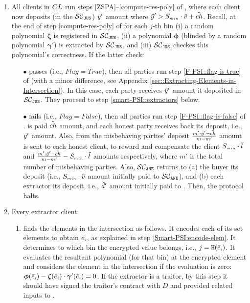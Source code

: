 \begin{enumerate}[leftmargin=4mm]
\item\label{e-psi::invoke-remainer-F-PSI} All clients in ${CL}$   run steps \ref{ZSPA}--\ref{compute-res-poly} of \fpsi, where each client now deposits (in the $\mathcal{SC}_{\mathtt{JUS}}$) $\ddot{y}'$ amount where $\ddot{y}'>S_{\scriptscriptstyle min}\cdot \ddot{v}+{\ddot{ch}}$. Recall, at the end of step \ref{compute-res-poly}  of \fpsi for each $j$-th bin (i) a random polynomial $\bm\zeta$ is registered in $\mathcal{SC}_{\mathtt{JUS}}$, (ii) a polynomial $\bm\phi$ (blinded by a random polynomial $\bm\gamma'$) is extracted by $\mathcal{SC}_{\mathtt{JUS}}$, and (iii) $\mathcal{SC}_{\mathtt{JUS}}$  checkes this polynomial's  correctness. If the latter check:

\begin{itemize}
\item[$\bullet$] passes (i.e., $Flag=True$), then all parties run step \ref{F-PSI::flag-is-true} of \fpsi (with a minor difference, see Appendix \ref{sec::Extracting-Elements-in-Intersection}).  In this case, each party receives $\ddot{y}'$ amount it deposited in $\mathcal{SC}_{\mathtt{JUS}}$. They proceed to step \ref{smart-PSI::extractors} below.

\item[$\bullet$]  fails (i.e., $Flag=False$), then all parties run step \ref{F-PSI::flag-is-false}  of \fpsi. 
 \aud is paid $\ddot{ch}$ amount, and each honest party receives back its deposit, i.e., $\ddot{y}'$ amount. Also,  from the misbehaving parties' deposit  $\frac{m'\cdot \ddot{y}'-\ddot{ch}}{m-m'}$ amount is sent to each honest client,  to reward and compensate the client $S_{\scriptscriptstyle min}\cdot \ddot{l}$ and $\frac{m'\cdot \ddot{y}'-\ddot{ch}}{m-m'}- S_{\scriptscriptstyle min}\cdot \ddot{l}$ amounts respectively, where $m'$ is the total number of misbehaving parties.  Also, $\mathcal{SC}_{\mathtt{ANE}}$ returns to (a) the buyer its deposit (i.e., $S_{\scriptscriptstyle min}\cdot \ddot{v}$ amount initially paid to $\mathcal{SC}_{\mathtt{ANE}}$), and (b) each extractor its deposit, i.e., $\ddot{d}'$ amount initially paid to \SCpc. Then, the protocol halts. 
\end{itemize}

\item\label{smart-PSI::extractors} Every extractor client: 
\begin{enumerate}

\item finds the elements in the intersection as follows. It encodes each of its set elements to obtain $\bar e_{\scriptscriptstyle i}$, as explained in step \ref{Smart-PSI:encode-elem}.  
%
It determines to which bin the encrypted value belongs, i.e., ${ {  {j}}}=\mathtt{H}( \bar{e}_{\scriptscriptstyle i})$. It evaluates the resultant polynomial (for that bin) at the encrypted element and considers the element in the intersection if the evaluation is zero: $\bm\phi( \bar{e}_{\scriptscriptstyle i})-\bm\zeta( \bar{e}_{\scriptscriptstyle i})\cdot \bm\gamma'( \bar{e}_{\scriptscriptstyle i})=0$. If the extractor is a traitor, by this step it should have signed the traitor’s contract \SCtc with $ { D}$ and provided related inputs to \SCtc. 


\end{enumerate}
\end{enumerate}
